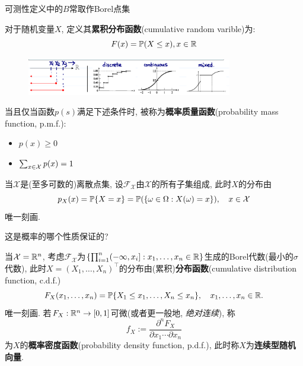 \begin{remark}
    可测性定义中的$B$常取作Borel点集
\end{remark}

\begin{definition}[累积分布函数]
    对于随机变量$X$, 定义其\textbf{累积分布函数}(cumulative random varible)为:
    \[ F(x)= \P(X \le  x), x \in \R \]
\end{definition}

\begin{figure}[h]
    \centering
    \includegraphics[width=0.8\textwidth]{image/cdf.png}
\end{figure}

\begin{definition}[概率质量函数]
    当且仅当函数$p(s)$满足下述条件时, 被称为\textbf{概率质量函数}(probability mass function, p.m.f.):
    \begin{itemize}
        \item $p(x)\ge 0$
        \item $\sum_{x \in \X}p(x)=1$
    \end{itemize}

    当$\mathcal{X}$是(至多可数的)离散点集, 设$\mathscr{F}_{\mathcal{X}}$由$\mathcal{X}$的所有子集组成, 此时$X$的分布由
    \[ p_{X}(x) = \P\{X=x\} = \P(\{\omega\in\Omega:X(\omega)=x\}), \quad x\in\mathcal{X} \]
    唯一刻画.
\end{definition}

\begin{remark}
    这是概率的哪个性质保证的?
\end{remark}

\begin{definition}
    当$\mathcal{X} = \R^{n}$, 考虑$\mathscr{F}_{\mathcal{X}}$为$\left\{\prod_{i=1}^{n}(-\infty,x_{i}] : x_{1},\dots,x_{n}\in\R\right\}$生成的Borel代数(最小的$\sigma$代数), 此时$X = (X_{1},\dots,X_{n})^{\top}$的分布由(累积)\textbf{分布函数}(cumulative distribution function, c.d.f.)
    \[ F_{X}(x_{1},\dots,x_{n}) = \P\{X_{1}\leq x_{1},\dots, X_{n}\leq x_{n}\}, \quad x_{1},\dots,x_{n}\in\R. \]
    唯一刻画. 若$F_{X} : \R^{n} \to [0,1]$可微(或者更一般地, \emph{绝对连续}), 称
    \[ f_{X} := \frac{\partial^{n} F_{X}}{\partial x_{1} \cdots \partial x_{n}} \]
    为$X$的\textbf{概率密度函数}(probability density function, p.d.f.), 此时称$X$为\textbf{连续型随机向量}.
\end{definition}

